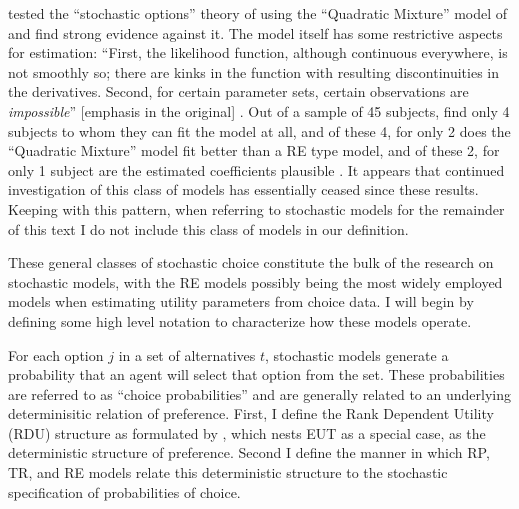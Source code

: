 \documentclass[../main.tex]{subfiles}
\begin{document}
\addtocounter{footnote}{-1}

\textcite{Hey1995} tested the \enquote{stochastic options} theory of \textcite{Machina1985} using the \enquote{Quadratic Mixture} model of \textcite{Chew1991} and find strong evidence against it.
The model itself has some restrictive aspects for estimation: \enquote{First, the likelihood function, although continuous everywhere, is not smoothly so; there are kinks in the function with resulting discontinuities in the derivatives.
Second, for certain parameter sets, certain observations are \textit{impossible}} [emphasis in the original] \parencite*[164]{Hey1995}.
Out of a sample of 45 subjects, \textcite{Hey1995} find only 4 subjects to whom they can fit the model at all, and of these 4, for only 2 does the \enquote{Quadratic Mixture} model fit better than a RE type model, and of these 2, for only 1 subject are the estimated coefficients plausible \parencite*[167]{Hey1995}.
It appears that continued investigation of this class of models has essentially ceased since these results.
Keeping with this pattern, when referring to stochastic models for the remainder of this text I do not include this class of models in our definition.

These general classes of stochastic choice constitute the bulk of the research on stochastic models, with the RE models possibly being the most widely employed models when estimating utility parameters from choice data.
I will begin by defining some high level notation to characterize how these models operate.

For each option $j$ in a set of alternatives $t$, stochastic models generate a probability that an agent will select that option from the set.
These probabilities are referred to as \enquote{choice probabilities} and are generally related to an underlying determinisitic relation of preference.
First, I define the Rank Dependent Utility (RDU) structure as formulated by \textcite{Quiggin1982}, which nests EUT as a special case, as the deterministic structure of preference.
Second I define the manner in which RP, TR, and RE  models relate this deterministic structure to the stochastic specification of probabilities of choice.
\end{document}
